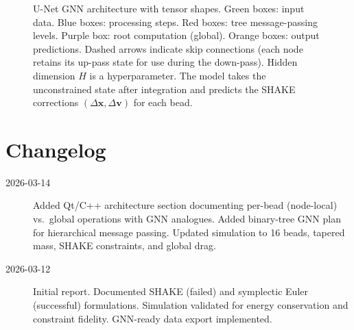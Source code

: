 \documentclass[11pt,a4paper]{article}
\begin{document}
\begin{figure}[H]
\caption{U-Net GNN architecture with tensor shapes. Green boxes: input data.
Blue boxes: processing steps. Red boxes: tree message-passing levels.
Purple box: root computation (global). Orange boxes: output predictions.
Dashed arrows indicate skip connections (each node retains its up-pass state
for use during the down-pass). Hidden dimension $H$ is a hyperparameter.
The model takes the unconstrained state after integration and predicts the
SHAKE corrections $(\Delta\mathbf{x}, \Delta\mathbf{v})$ for each bead.}
\label{fig:unet_model}
\end{figure}

\section{Changelog}
\label{sec:changelog}

\begin{description}
    \item[2026-03-14] Added Qt/C++ architecture section documenting per-bead
          (node-local) vs.\ global operations with GNN analogues. Added
          binary-tree GNN plan for hierarchical message passing. Updated
          simulation to 16 beads, tapered mass, SHAKE constraints, and
          global drag.
    \item[2026-03-12] Initial report. Documented SHAKE (failed) and
          symplectic Euler (successful) formulations. Simulation validated
          for energy conservation and constraint fidelity. GNN-ready data
          export implemented.
\end{description}
\end{document}
